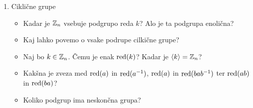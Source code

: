 \begin{enumerate}
    \item Ciklične grupe
    \begin{itemize}
        \item Kadar je $\mathbb{Z}_n$ vsebuje podgrupo reda $k$? Alo je ta podgrupa enolična?
        \item Kaj lahko povemo o vsake podrupe cilkične grupe?
        \item Naj bo $k \in \mathbb{Z}_n$. Čemu je enak $\operatorname{red} (k)$? Kadar je $\left\langle k \right\rangle  = \mathbb{Z}_n$?
        \item Kakšna je zveza med $\operatorname{red} (a)$ in $\operatorname{red} (a^{-1})$, $\operatorname{red} (a)$ in $\operatorname{red} (bab^{-1})$ ter $\operatorname{red} (ab)$ in $\operatorname{red} (ba)$?
        \item Koliko podgrup ima neskončna grupa?
    \end{itemize}
\end{enumerate}
